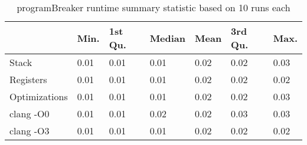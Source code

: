 \begin{table}[h!]
\centering
\begin{tabular}{p{}p{}p{}p{}p{}p{}p{}}
  \hline
 & Min. & 1st Qu. & Median & Mean & 3rd Qu. & Max. \\ 
  \hline
Stack & 0.01 & 0.01 & 0.01 & 0.02 & 0.02 & 0.03 \\ 
  Registers & 0.01 & 0.01 & 0.01 & 0.02 & 0.02 & 0.02 \\ 
  Optimizations & 0.01 & 0.01 & 0.01 & 0.02 & 0.02 & 0.03 \\ 
  clang -O0 & 0.01 & 0.01 & 0.02 & 0.02 & 0.03 & 0.03 \\ 
  clang -O3 & 0.01 & 0.01 & 0.01 & 0.02 & 0.02 & 0.02 \\ 
   \hline
\end{tabular}
\caption{programBreaker runtime summary statistic based on 10 runs each}
\end{table}
